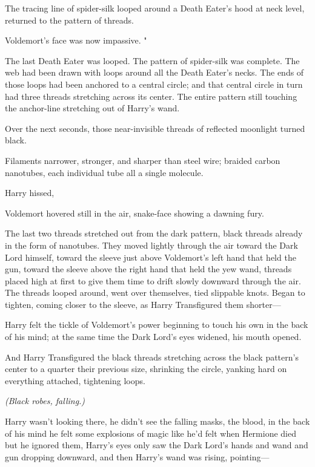 The tracing line of spider-silk looped around a Death Eater's hood at neck
level, returned to the pattern of threads.

Voldemort's face was now impassive. "

The last Death Eater was looped. The pattern of spider-silk was complete. The
web had been drawn with loops around all the Death Eater's necks. The ends of
those loops had been anchored to a central circle; and that central circle in
turn had three threads stretching across its center. The entire pattern still
touching the anchor-line stretching out of Harry's wand.

Over the next seconds, those near-invisible threads of reflected moonlight
turned black.

Filaments narrower, stronger, and sharper than steel wire; braided carbon
nanotubes, each individual tube all a single molecule.

Harry hissed, 

Voldemort hovered still in the air, snake-face showing a dawning fury.

The last two threads stretched out from the dark pattern, black threads already
in the form of nanotubes. They moved lightly through the air toward the Dark
Lord himself, toward the sleeve just above Voldemort's left hand that held the
gun, toward the sleeve above the right hand that held the yew wand, threads
placed high at first to give them time to drift slowly downward through the
air. The threads looped around, went over themselves, tied slippable knots.
Began to tighten, coming closer to the sleeve, as Harry Transfigured them
shorter---

Harry felt the tickle of Voldemort's power beginning to touch his own in the
back of his mind; at the same time the Dark Lord's eyes widened, his mouth
opened.

And Harry Transfigured the black threads stretching across the black pattern's
center to a quarter their previous size, shrinking the circle, yanking hard on
everything attached, tightening loops.

\emph{(Black robes, falling.)}

Harry wasn't looking there, he didn't see the falling masks, the blood, in the
back of his mind he felt some explosions of magic like he'd felt when Hermione
died but he ignored them, Harry's eyes only saw the Dark Lord's hands and wand
and gun dropping downward, and then Harry's wand was rising, pointing---

